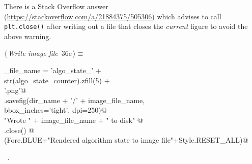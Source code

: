 \documentclass[11.5pt]{report}
\begin{document}
There is a  Stack Overflow answer (\url{https://stackoverflow.com/a/21884375/505306}) 
which advises to call \verb|plt.close()| after writing out a file that closes the 
\textit{current} figure to avoid the above warning. 
\begin{flushleft} \small\label{scrap46}\raggedright\small
{} $\langle\,${\itshape Write image file}\nobreak\ {\footnotesize {36e}}$\,\rangle\equiv$
\vspace{-1ex}
\begin{list}{}{} \item
\mbox{}\verb@image_file_name = 'algo_state_'                    +\@\\
\mbox{}\verb@                  str(algo_state_counter).zfill(5) +\@\\
\mbox{}\verb@                     '.png'@\\
\mbox{}\verb@plt.savefig(dir_name + '/' + image_file_name,  \@\\
\mbox{}\verb@            bbox_inches='tight', dpi=250)@\\
\mbox{}\verb@print "Wrote " + image_file_name + " to disk"   @\\
\mbox{}\verb@plt.close() @\\
\mbox{}\verb@debug(Fore.BLUE+"Rendered algorithm state to image file"+Style.RESET_ALL)@\\
\mbox{}\verb@@{\NWsep}
\end{list}
\vspace{-1.5ex}
\footnotesize
\begin{list}{}{\setlength{\itemsep}{-\parsep}\setlength{\itemindent}{-\leftmargin}}
\item \NWtxtMacroRefIn\ .

\item{}
\end{list}
\vspace{4ex}
\end{flushleft}
\end{document}
